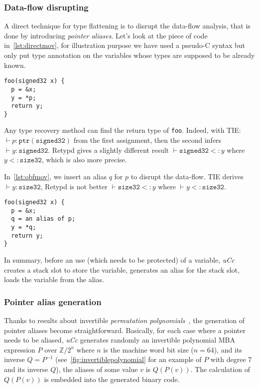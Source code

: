 \documentclass[compsoc,conference,a4paper,10pt,times]{IEEEtran}
\begin{document}
\subsubsection*{Data-flow disrupting}
A direct technique for type flattening is to disrupt the data-flow analysis, that is done by
introducing \emph{pointer aliases}. Let's look at the
piece of code in~\cref{lst:directmov}, for illustration purpose we have used a pseudo-C syntax but only
put type annotation on the variables whose types are supposed to be already known.
\begin{lstlisting}[style={c},caption={Direct data movement},label={lst:directmov}]
foo(signed32 x) {
  p = &x;
  y = *p;
  return y;
}
\end{lstlisting}
Any type recovery method can find the return type of \texttt{foo}. Indeed,
with TIE: $\vdash p \colon \mathtt{ptr}(\mathtt{signed32})$ from the first assignment,
then the second infers $\vdash y \colon \mathtt{signed32}$. Retypd gives a slightly
different result $\vdash \mathtt{signed32} <\colon y$
where $y <\colon \mathtt{size32}$, which is also more precise.

In~\cref{lst:obfmov}, we insert an alias $q$ for $p$ to disrupt the data-flow.
TIE derives $\vdash y \colon \mathtt{size32}$, Retypd is not better
$\vdash \mathtt{size32} <\colon y$ where $\vdash y <\colon \mathtt{size32}$.
\begin{lstlisting}[style={c},caption={Data movement with pointer alias},label={lst:obfmov}]
foo(signed32 x) {
  p = &x;
  q = an alias of p;
  y = *q;
  return y;
}
\end{lstlisting}
In summary, before an use (which needs to be protected) of a
variable, \emph{uCc} \raisebox{.5pt}{\textcircled{\raisebox{-.9pt} {1}}} creates a stack slot to store the variable,
\raisebox{.5pt}{\textcircled{\raisebox{-.9pt} {2}}} generates an alias for the stack slot,
\raisebox{.5pt}{\textcircled{\raisebox{-.9pt} {3}}} loads the variable from the alias.

\subsubsection*{Pointer alias generation}
Thanks to results about invertible \emph{permutation polynomials}~\cite{zhou_information_2007}, the
generation of pointer aliases become straightforward. Basically, for each case where a pointer needs to
be aliased, \emph{uCc} generates randomly an invertible polynomial MBA expression $P$ over
$\mathbb{Z}/2^n$ where $n$ is the machine word bit size ($n = 64$), and its inverse $Q = P^{-1}$
(see~\cref{fig:invertiblepolynomial} for an example of $P$ with degree 7 and its inverse $Q$),
the aliases of some value $v$ is $Q(P(v))$. The calculation of $Q(P(v))$ is embedded into the generated
binary code.
\end{document}
